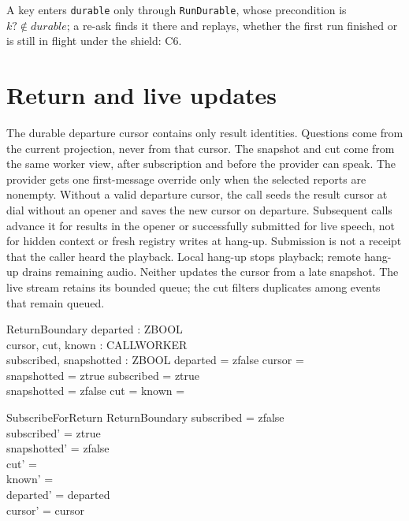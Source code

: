 \documentclass[a4paper,10pt,fleqn]{article}
\begin{document}
A key enters \texttt{durable} only through \texttt{RunDurable}, whose
precondition is $k? \notin durable$; a re-ask finds it there and replays,
whether the first run finished or is still in flight under the shield: C6.

\section{Return and live updates}

The durable departure cursor contains only result identities. Questions
come from the current projection, never from that cursor. The snapshot
and cut come from the same worker view, after subscription and before
the provider can speak. The provider gets one first-message override
only when the selected reports are nonempty.
Without a valid departure cursor, the call seeds the result cursor at dial
without an opener and saves the new cursor on departure. Subsequent
calls advance it for results in the opener or successfully submitted for
live speech, not for hidden context or fresh registry writes at hang-up.
Submission is not a receipt that the caller heard the playback.
Local hang-up stops playback; remote hang-up drains remaining audio.
Neither updates the cursor from a late snapshot. The live stream retains
its bounded queue; the cut filters duplicates among events that remain queued.

\begin{zed}
  [CALLWORKER]
\end{zed}

\begin{schema}{ReturnBoundary}
  departed : ZBOOL \\
  cursor, cut, known : CALLWORKER \pfun \nat \\
  subscribed, snapshotted : ZBOOL
\where
  departed = zfalse \implies cursor = \emptyset \\
  snapshotted = ztrue \implies subscribed = ztrue \\
  snapshotted = zfalse \implies cut = \emptyset \land known = \emptyset
\end{schema}

\begin{schema}{SubscribeForReturn}
  \Delta ReturnBoundary
\where
  subscribed = zfalse \\
  subscribed' = ztrue \\
  snapshotted' = zfalse \\
  cut' = \emptyset \\
  known' = \emptyset \\
  departed' = departed \\
  cursor' = cursor
\end{schema}
\end{document}
